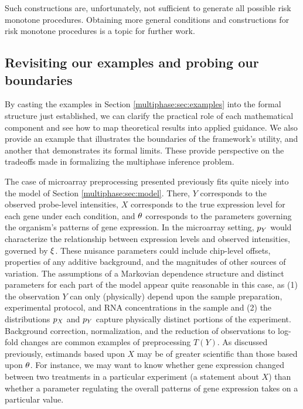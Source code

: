 Such constructions are, unfortunately, not sufficient to generate all possible risk monotone procedures.
Obtaining more general conditions and constructions for risk monotone procedures is a topic for further work.

\subsection{Revisiting our examples and probing our boundaries}
\label{multiphase:sec:revisit}

By casting the examples in Section \ref{multiphase:sec:examples} into the formal structure just established, we can clarify the practical role of each mathematical component and see how to map theoretical results into applied guidance.
We also provide an example  that illustrates the boundaries of the framework's utility, and another that demonstrates its formal limits.
These provide perspective on the tradeoffs made in formalizing the multiphase inference problem. 

The case of microarray preprocessing presented previously fits quite nicely into the model of Section \ref{multiphase:sec:model}.
There, $Y$ corresponds to the observed probe-level intensities, $X$ corresponds to the true expression level for each gene under each condition, and $\theta$ corresponds to the parameters governing the organism's patterns of gene expression.
In the microarray setting, $p_Y$ would characterize the relationship between expression levels and observed intensities, governed by $\xi$.
These nuisance parameters could include chip-level offsets, properties of any additive background, and the magnitudes of other sources of variation.
The assumptions of a Markovian dependence structure and distinct parameters for each part of the model appear quite reasonable in this case, as (1) the observation $Y$ can only (physically) depend upon the sample preparation, experimental protocol, and RNA concentrations in the sample and (2) the distributions $p_X$ and $p_Y$ capture physically distinct portions of the experiment.
Background correction, normalization, and the reduction of observations to log-fold changes are common examples of preprocessing $T(Y)$. As discussed previously, estimands based upon $X$ may be of greater scientific than those based upon $\theta$.
For instance, we may want to know  whether gene expression changed between two treatments in a particular experiment (a statement about $X$) than whether a parameter regulating the overall patterns of gene expression takes on a particular value.

